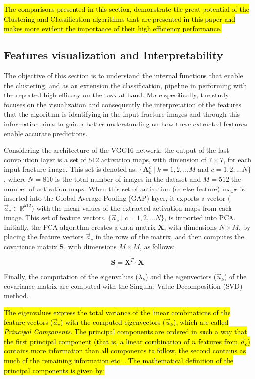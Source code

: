 \documentclass[authoryear,preprint,review,12pt, singleside]{elsarticle}
\begin{document}
\hl{The comparisons presented in this section,  demonstrate the great potential of the Clustering and Classification algorithms that are presented in this paper and makes more evident the importance of their high efficiency performance.}

 
\subsection{Features visualization and Interpretability}

The objective of this section is to understand the internal functions that enable the clustering, and as an extension the classification, pipeline in performing with the reported high efficacy on the task at hand. More specifically, the study focuses on the visualization and consequently the interpretation of the features that the algorithm is identifying in the input fracture images and through this information aims to gain a better understanding on how these extracted features enable accurate predictions. 

Considering the architecture of the VGG16 network, the output of the last convolution layer is a set of 512 activation maps, with dimension of $7 \times 7$, for each input fracture image. This set is  denoted as: $\{\textbf{A}_k^c \; | \; k=1,2, ... M \text{ and } c=1,2, ... N\}$, where $N=810$ is the total number of images in the dataset and $M=512$ the number of activation maps. When this set of activation (or else feature) maps is inserted into the Global Average Pooling (GAP) layer, it exports a vector ($\vec{a}_c \in \mathbb{R}^{512}$) with the mean values of the extracted activation maps from each image. This set of feature vectors, $\{\vec{a}_c \; | \; c=1,2, ... N\}$, is imported into PCA. Initially, the PCA algorithm creates a data matrix $\textbf{X}$, with dimensions $N \times M$, by placing the feature vectors $\vec{a}_c$ in the rows of the matrix, and then computes the covariance matrix $\textbf{S}$, with dimensions $M \times M$, as follows: 

\begin{equation*}
\textbf{S} = \textbf{X}^T \cdot \textbf{X}
\end{equation*}

Finally, the computation of the eigenvalues ($\lambda_k$) and the eigenvectors ($\vec{u}_k$) of the covariance matrix are computed with the Singular Value Decomposition (SVD) method. 

\hl{The eigenvalues express the total variance of the linear combinations of the feature vectors ($\vec{a}_c$) with the computed eigenvectors ($\vec{u}_k$), which are called \textit{Principal Components}. The principal components are ordered in such a way that the first principal component (that is, a linear combination of $n$ features from  $\vec{a}_c$) contains more information than all components to follow, the second contains as much of the remaining information etc. . The mathematical definition of the principal components is given by:}
\end{document}
